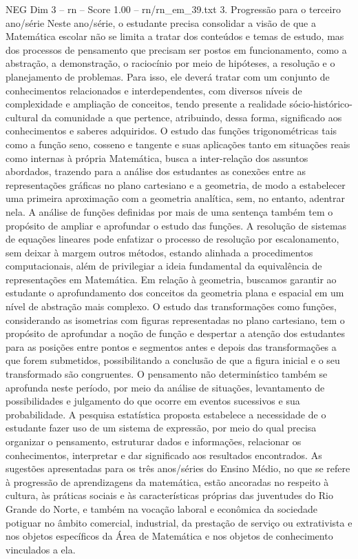 \begin{textsample}{NEG Dim 3 – rn – Score 1.00 – rn/rn\_em\_39.txt}  \label{ex:f3_neg_196}
3.
Progressão para o terceiro ano/série Neste ano/série, o estudante precisa consolidar a visão de que a Matemática escolar não se limita a tratar dos conteúdos e temas de estudo, mas dos processos de pensamento que precisam ser postos em funcionamento, como a abstração, a demonstração, o raciocínio por meio de hipóteses, a resolução e o planejamento de problemas.
Para isso, ele deverá tratar com um conjunto de conhecimentos relacionados e interdependentes, com diversos níveis de complexidade e ampliação de conceitos, tendo presente a realidade sócio-histórico-cultural da comunidade a que pertence, atribuindo, dessa forma, significado aos conhecimentos e saberes adquiridos.
O estudo das funções trigonométricas tais como a função seno, cosseno e tangente e suas aplicações tanto em situações reais como internas à própria Matemática, busca a inter-relação dos assuntos abordados, trazendo para a análise dos estudantes as conexões entre as representações gráficas no plano cartesiano e a geometria, de modo a estabelecer uma primeira aproximação com a geometria analítica, sem, no entanto, adentrar nela.
A análise de funções definidas por mais de uma sentença também tem o propósito de ampliar e aprofundar o estudo das funções.
A resolução de sistemas de equações lineares pode enfatizar o processo de resolução por escalonamento, sem deixar à margem outros métodos, estando alinhada a procedimentos computacionais, além de privilegiar a ideia fundamental da equivalência de representações em Matemática.
Em relação à geometria, buscamos garantir ao estudante o aprofundamento dos conceitos da geometria plana e espacial em um nível de abstração mais complexo.
O estudo das transformações como funções, considerando as isometrias com figuras representadas no plano cartesiano, tem o propósito de aprofundar a noção de função e despertar a atenção dos estudantes para as posições entre pontos e segmentos antes e depois das transformações a que forem submetidos, possibilitando a conclusão de que a figura inicial e o seu transformado são congruentes.
O pensamento não determinístico também se aprofunda neste período, por meio da análise de situações, levantamento de possibilidades e julgamento do que ocorre em eventos sucessivos e sua probabilidade.
A pesquisa estatística proposta estabelece a necessidade de o estudante fazer uso de um sistema de expressão, por meio do qual precisa organizar o pensamento, estruturar dados e informações, relacionar os conhecimentos, interpretar e dar significado aos resultados encontrados.
As sugestões apresentadas para os três anos/séries do Ensino Médio, no que se refere à progressão de aprendizagens da matemática, estão ancoradas no respeito à cultura, às práticas sociais e às características próprias das juventudes do Rio Grande do Norte, e também na vocação laboral e econômica da sociedade potiguar no âmbito comercial, industrial, da prestação de serviço ou extrativista e nos objetos específicos da Área de Matemática e nos objetos de conhecimento vinculados a ela.

\end{textsample}
